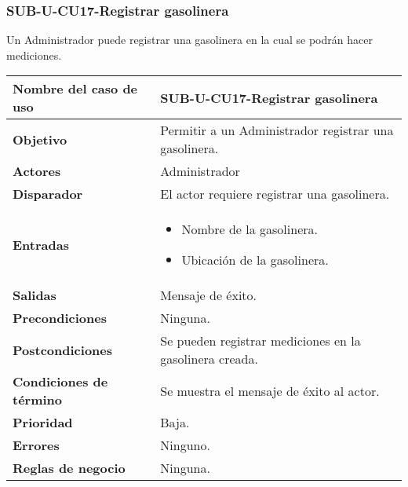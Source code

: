 \subsubsection{SUB-U-CU17-Registrar gasolinera}\label{SUB-U-CU17}
Un Administrador puede registrar una gasolinera en la cual se podrán hacer mediciones.

\begin{longtable}{|J{5cm}|J{10.3cm}|}
	\hline
	\textbf{Nombre del caso de uso} &
		SUB-U-CU17-Registrar gasolinera \\ \hline
	\textbf{Objetivo} &
		Permitir a un Administrador registrar una gasolinera. \\ \hline
	\textbf{Actores} &
		Administrador \\ \hline 
	\textbf{Disparador} & 
		El actor requiere registrar una gasolinera. \\ \hline 
	\textbf{Entradas} & 
		\begin{itemize}
				\item Nombre de la gasolinera.
				\item Ubicación de la gasolinera.
		\end{itemize}\\ \hline 
	\textbf{Salidas} & Mensaje de éxito.
		\\ \hline
	\textbf{Precondiciones} & Ninguna.
		\\ \hline
	\textbf{Postcondiciones} & Se pueden registrar mediciones en la gasolinera creada.
		\\ \hline
	\textbf{Condiciones de término} & Se muestra el mensaje de éxito al actor.
		\\ \hline 
	\textbf{Prioridad} & 
		Baja. \\ \hline
	\textbf{Errores} & Ninguno.
		\\ \hline
	\textbf{Reglas de negocio} & Ninguna.
		 \\ \hline
\end{longtable}


